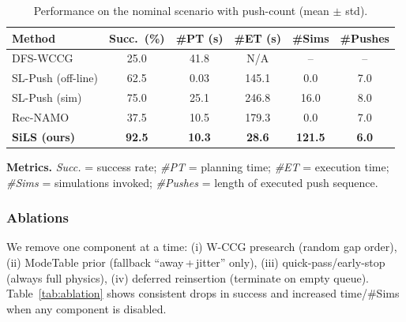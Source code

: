 \begin{table}[t]
  \centering
  \begin{threeparttable}
  \caption{Performance on the nominal scenario with push-count (mean $\pm$ std).}
  \label{tab:main}
  \vspace{2pt}
  
  \setlength{\tabcolsep}{2.3pt} %
  
\begin{tabular}{lccccc}
\toprule
Method & Succ.~(\%) & \#PT (s) & \#ET (s) & \#Sims & \#Pushes \\
\midrule
DFS-WCCG            & 25.0  & 41.8  & N/A     & --    & --   \\
SL-Push (off-line)  & 62.5  & 0.03  & 145.1   & 0.0   & 7.0  \\
SL-Push (sim)       & 75.0  & 25.1  & 246.8   & 16.0  & 8.0  \\
Rec-NAMO            & 37.5  & 10.5  & 179.3   & 0.0   & 7.0  \\
\textbf{SiLS (ours)}& \textbf{92.5} & \textbf{10.3} & \textbf{28.6} & \textbf{121.5} & \textbf{6.0} \\
\bottomrule
\end{tabular}
  
  \begin{tablenotes}[flushleft]\footnotesize
  \item \textbf{Metrics.} \emph{Succ.} = success rate; \emph{\#PT} = planning time; \emph{\#ET} = execution time;
  \emph{\#Sims} = simulations invoked; \emph{\#Pushes} = length of executed push sequence.
  \end{tablenotes}
  \end{threeparttable}
  \end{table}
  


\subsubsection{Ablations}
\label{subsec:ablations}
We remove one component at a time: (i) W-CCG presearch (random gap order),
(ii) ModeTable prior (fallback “away\,+\,jitter” only),
(iii) quick-pass/early-stop (always full physics),
(iv) deferred reinsertion (terminate on empty queue).
Table~\ref{tab:ablation} shows consistent drops in success and increased
time/\#Sims when any component is disabled.



